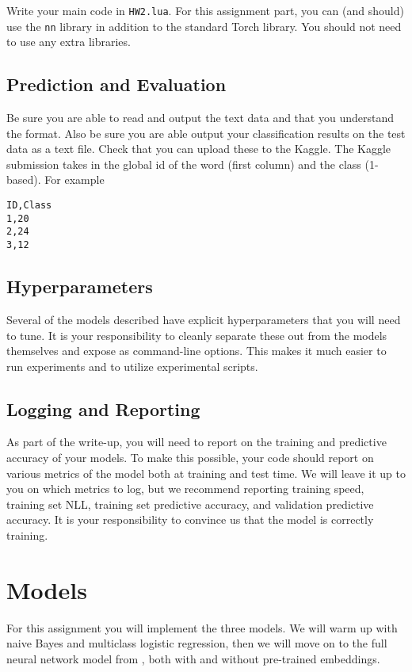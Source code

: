 \documentclass[11pt]{article}
\begin{document}
Write your main code in \texttt{HW2.lua}. For this assignment part,
you can (and should) use the \texttt{nn} library in addition to the
standard Torch library. You should not need to use any extra libraries.

\subsection{Prediction and Evaluation}

Be sure you are able to read and output the text data and that you
understand the format.  Also be sure you are able output your
classification results on the test data as a text file. Check that you
can upload these to the Kaggle. The Kaggle submission takes in the
global id of the word (first column) and the class (1-based). For
example

\begin{verbatim}
ID,Class
1,20
2,24
3,12
\end{verbatim}

\subsection{Hyperparameters}

Several of the models described have explicit hyperparameters that you will 
need to tune. It is your responsibility to cleanly separate these out from 
the models themselves and expose as command-line options. This makes it much 
easier to run experiments and to utilize experimental scripts. 

\subsection{Logging and Reporting}

As part of the write-up, you will need to report on the training and
predictive accuracy of your models. To make this possible, your code
should report on various metrics of the model both at training and
test time. We will leave it up to you on which metrics to log, but we
recommend reporting training speed, training set NLL, training set
predictive accuracy, and validation predictive accuracy. It is your
responsibility to convince us that the model is correctly training.

\section{Models}

For this assignment you will implement the three models. We will warm
up with naive Bayes and multiclass logistic regression, then we will
move on to the full neural network model from
\citet{collobert2011natural}, both with and without pre-trained embeddings.
\end{document}
